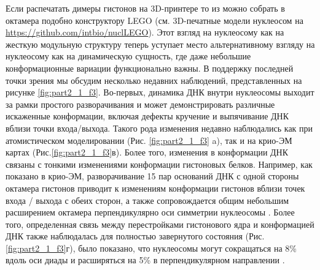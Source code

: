     Если распечатать димеры гистонов на 3D-принтере то из можно собрать в октамера подобно конструктору LEGO (см. 3D-печатные модели нуклеосом на \url{https://github.com/intbio/nuclLEGO}). Этот взгляд на нуклеосому как на жесткую модульную структуру теперь уступает место альтернативному взгляду на нуклеосому как на динамическую сущность, где даже небольшие конформационные вариации функционально важны. В поддержку последней точки зрения мы обсудим несколько недавних наблюдений, представленных на рисунке \ref{fig:part2_1_f3}. Во-первых, динамика ДНК внутри нуклеосомы выходит за рамки простого разворачивания и может демонстрировать различные искаженные конформации, включая дефекты кручение и выпячивание ДНК вблизи точки входа/выхода. Такого рода изменения недавно наблюдались как при атомистическом моделировании \cite{shaytan_coupling_2016} (Рис. \ref{fig:part2_1_f3} a), так и на крио-ЭМ картах \cite{bilokapic_histone_2018} (Рис.\ref{fig:part2_1_f3}в). Более того, изменения в конформации ДНК связаны с тонкими изменениями конформации гистоновых белков. Например, как показано в крио-ЭМ, разворачивание 15 пар оснований ДНК с одной стороны октамера гистонов приводит к изменениям конформации гистонов вблизи точек входа / выхода с обеих сторон, а также сопровождается общим небольшим расширением октамера перпендикулярно оси симметрии нуклеосомы \cite{bilokapic_histone_2018}. Более того, определенная связь между перестройками гистонового ядра и конформацией ДНК также наблюдалась для полностью завернутого состояния (Рис.\ref{fig:part2_1_f3}г), было показано, что нуклеосомы могут сокращаться на 8\% вдоль оси диады и расширяться на 5\% в перпендикулярном направлении \cite{bilokapic_structural_2018}.

